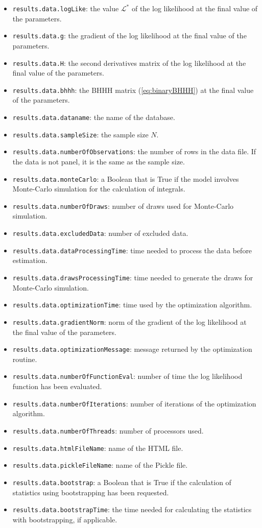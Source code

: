 \documentclass[12pt,a4paper]{article}
\newcommand{\req}[1]{(\ref{#1})}
\begin{document}
\begin{itemize}
\item \lstinline+results.data.logLike+: the value $\mathcal{L}^*$ of
  the log likelihood at the final value of the parameters. 
\item \lstinline+results.data.g+: the gradient of the log likelihood at the final value of the parameters. 
\item \lstinline+results.data.H+: the second derivatives matrix of the log likelihood at the final value of the parameters. 
\item \lstinline+results.data.bhhh+:  the BHHH matrix \req{eq:binaryBHHH}  at the final value of the parameters. 
\item \lstinline+results.data.dataname+: the name of the database.
\item \lstinline+results.data.sampleSize+: the sample size $N$.
\item \lstinline+results.data.numberOfObservations+: the number of
  rows in the data file. If the data is not panel, it is the same as
  the sample size. 
\item \lstinline+results.data.monteCarlo+: a Boolean that is True if
  the model involves Monte-Carlo simulation for the calculation of
  integrals. 
\item \lstinline+results.data.numberOfDraws+: number of draws used for
  Monte-Carlo simulation. 
\item \lstinline+results.data.excludedData+: number of excluded data. 
\item \lstinline+results.data.dataProcessingTime+: time needed to
  process the data before estimation. 
\item \lstinline+results.data.drawsProcessingTime+: time needed to
  generate the draws for Monte-Carlo simulation. 
\item \lstinline+results.data.optimizationTime+: time used by the
  optimization algorithm. 
\item \lstinline+results.data.gradientNorm+: norm of the gradient of
  the log likelihood at the final value of the parameters. 
\item \lstinline+results.data.optimizationMessage+: message returned
  by the optimization routine. 
\item \lstinline+results.data.numberOfFunctionEval+: number of time
  the log likelihood function has been evaluated. 
\item \lstinline+results.data.numberOfIterations+: number of
  iterations of the optimization algorithm.
\item \lstinline+results.data.numberOfThreads+: number of processors
  used. 
\item \lstinline+results.data.htmlFileName+: name of the HTML file. 
\item \lstinline+results.data.pickleFileName+: name of the Pickle
  file. 
\item \lstinline+results.data.bootstrap+: a Boolean that is True if
  the calculation of statistics using bootstrapping has been
  requested. 
\item \lstinline+results.data.bootstrapTime+: the time needed for
  calculating the statistics with bootstrapping, if applicable. 
\end{itemize}
\end{document}
